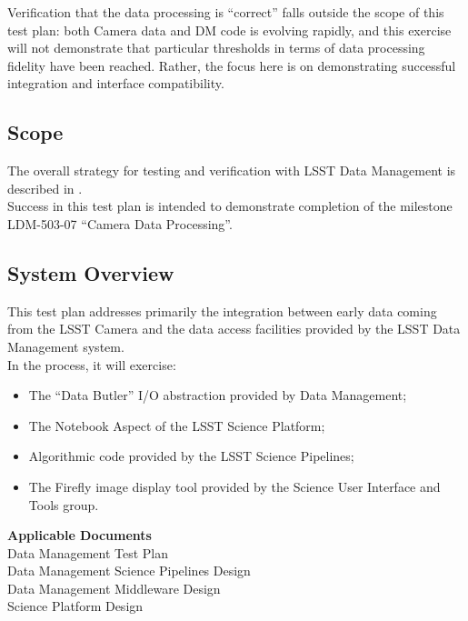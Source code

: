 \documentclass[DM,lsstdraft,STR,toc]{lsstdoc}
\providecommand{\tightlist}{
  \setlength{\itemsep}{0pt}\setlength{\parskip}{0pt}}
\begin{document}
Verification that the data processing is ``correct'' falls outside the
scope of this test plan: both Camera data and DM code is evolving
rapidly, and this exercise will not demonstrate that particular
thresholds in terms of data processing fidelity have been reached.
Rather, the focus here is on demonstrating successful integration and
interface compatibility.\\[2\baselineskip]

\subsection{Scope}\label{scope}

The overall strategy for testing and verification with LSST Data
Management is described in .\\
Success in this test plan is intended to demonstrate completion of the
milestone LDM-503-07 ``Camera Data Processing''.



\subsection{System Overview}
\label{sect:systemoverview}

This test plan addresses primarily the integration between early data
coming from the LSST Camera and the data access facilities provided by
the LSST Data Management system.\\[2\baselineskip]In the process, it
will exercise:

\begin{itemize}
\tightlist
\item
  The ``Data Butler'' I/O abstraction provided by Data Management;
\item
  The Notebook Aspect of the LSST Science Platform;
\item
  Algorithmic code provided by the LSST Science Pipelines;
\item
  The Firefly image display tool provided by the Science User Interface
  and Tools group.
\end{itemize}

\textbf{Applicable Documents}\\[2\baselineskip] Data Management
Test Plan\\
 Data Management Science Pipelines Design\\
 Data Management Middleware Design\\
 Science Platform Design
\end{document}
